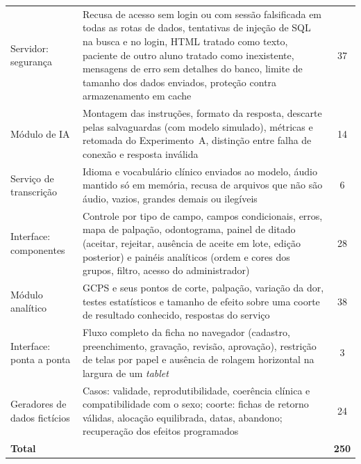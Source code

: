 \begin{table}[!h]
\begin{tabularx}{\textwidth}{L{3cm}Yc}
		Servidor: segurança & Recusa de acesso sem login ou com sessão falsificada em todas as rotas de dados, tentativas de injeção de SQL na busca e no login, HTML tratado como texto, paciente de outro aluno tratado como inexistente, mensagens de erro sem detalhes do banco, limite de tamanho dos dados enviados, proteção contra armazenamento em cache & 37 \\
		Módulo de IA & Montagem das instruções, formato da resposta, descarte pelas salvaguardas (com modelo simulado), métricas e retomada do Experimento~A, distinção entre falha de conexão e resposta inválida & 14 \\
		Serviço de transcrição & Idioma e vocabulário clínico enviados ao modelo, áudio mantido só em memória, recusa de arquivos que não são áudio, vazios, grandes demais ou ilegíveis & 6 \\
		Interface: componentes & Controle por tipo de campo, campos condicionais, erros, mapa de palpação, odontograma, painel de ditado (aceitar, rejeitar, ausência de aceite em lote, edição posterior) e painéis analíticos (ordem e cores dos grupos, filtro, acesso do administrador) & 28 \\
		Módulo analítico & GCPS e seus pontos de corte, palpação, variação da dor, testes estatísticos e tamanho de efeito sobre uma coorte de resultado conhecido, respostas do serviço & 38 \\
		Interface: ponta a ponta & Fluxo completo da ficha no navegador (cadastro, preenchimento, gravação, revisão, aprovação), restrição de telas por papel e ausência de rolagem horizontal na largura de um \textit{tablet} & 3 \\
		Geradores de dados fictícios & Casos: validade, reprodutibilidade, coerência clínica e compatibilidade com o sexo; coorte: fichas de retorno válidas, alocação equilibrada, datas, abandono; recuperação dos efeitos programados & 24 \\
		\textbf{Total} & & \textbf{250} \\ \hline
	\end{tabularx}
\end{table}
